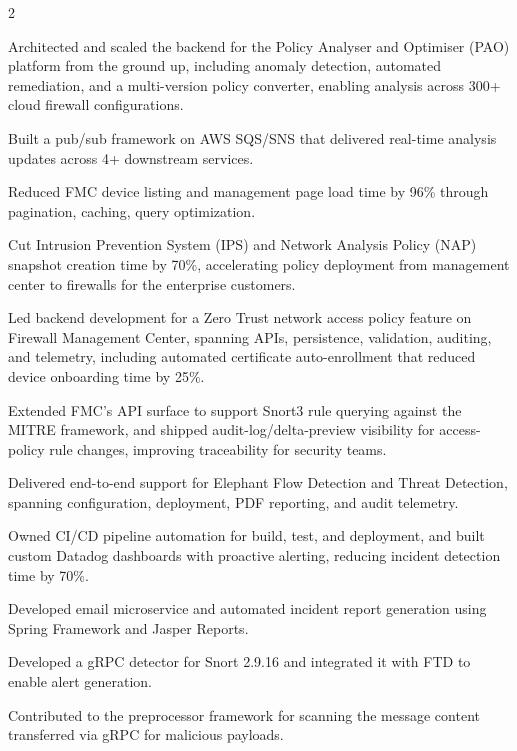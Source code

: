 \documentclass[]{hieudo-build}
\begin{document}
\begin{paracol}{2}
\begin{tightemize}
 \item Architected and scaled the backend for the Policy Analyser and Optimiser (PAO) platform from the ground up, including anomaly detection, automated remediation, and a multi-version policy converter, enabling analysis across 300+ cloud firewall configurations.
 \item Built a pub/sub framework on AWS SQS/SNS that delivered real-time analysis updates across 4+ downstream services.
 \item Reduced FMC device listing and management page load time by 96\% through pagination, caching, query optimization.
 \item Cut Intrusion Prevention System (IPS) and Network Analysis Policy (NAP) snapshot creation time by 70\%, accelerating policy deployment from management center to firewalls for the enterprise customers.
 \item Led backend development for a Zero Trust network access policy feature on Firewall Management Center, spanning APIs, persistence, validation, auditing, and telemetry, including automated certificate auto-enrollment that reduced device onboarding time by 25\%.
 \item Extended FMC's API surface to support Snort3 rule querying against the MITRE framework, and shipped audit-log/delta-preview visibility for access-policy rule changes, improving traceability for security teams.
 \item Delivered end-to-end support for Elephant Flow Detection and Threat Detection, spanning configuration, deployment, PDF reporting, and audit telemetry.
 \item Owned CI/CD pipeline automation for build, test, and deployment, and built custom Datadog dashboards with proactive alerting, reducing incident detection time by 70\%.
\end{tightemize}
\sectionsep


\begin{tightemize}
 \item Developed email microservice and automated incident report generation using Spring Framework and Jasper Reports.
\end{tightemize}
\sectionsep 


\begin{tightemize}
 \item Developed a gRPC detector for Snort 2.9.16 and integrated it with FTD to enable alert generation.
 \item Contributed to the preprocessor framework for scanning the message content transferred via gRPC for malicious payloads.
\end{tightemize}
\sectionsep


\end{paracol}
\end{document}
